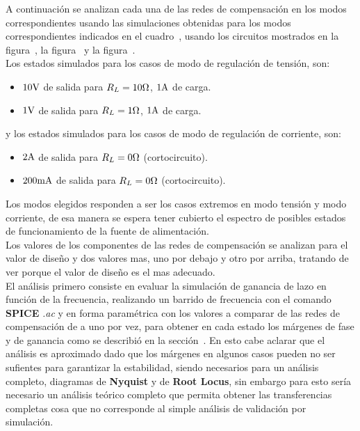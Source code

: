 
A continuación se analizan cada una de las redes de compensación en los modos correspondientes usando las simulaciones obtenidas para los modos correspondientes indicados en el cuadro~, usando los circuitos mostrados en la figura~, la figura~ y la figura~.\\

Los estados simulados para los casos de modo de regulación de tensión, son:

\begin{itemize}
\item $10 \si[per-mode=symbol]{\volt}$ de salida para $R_{L} = 10 \si[per-mode=symbol]{\ohm}$, $1 \si[per-mode=symbol]{\ampere}$ de carga.

\item $1 \si[per-mode=symbol]{\volt}$ de salida para $R_{L} = 1 \si[per-mode=symbol]{\ohm}$, $1 \si[per-mode=symbol]{\ampere}$ de carga.
\end{itemize}

y los estados simulados para los casos de modo de regulación de corriente, son:

\begin{itemize}
\item $2 \si[per-mode=symbol]{\ampere}$ de salida para $R_{L} = 0 \si[per-mode=symbol]{\ohm}$ (cortocircuito).

\item $200 \si[per-mode=symbol]{\milli\ampere}$ de salida para $R_{L} = 0 \si[per-mode=symbol]{\ohm}$ (cortocircuito).
\end{itemize}



Los modos elegidos responden a ser los casos extremos en modo tensión y modo corriente, de esa manera se espera tener cubierto el espectro de posibles estados de funcionamiento de la fuente de alimentación.\\

Los valores de los componentes de las redes de compensación se analizan para el valor de diseño y dos valores mas, uno por debajo y otro por arriba, tratando de ver porque el valor de diseño es el mas adecuado.\\

El análisis primero consiste en evaluar la simulación de ganancia de lazo en función de la frecuencia, realizando un barrido de frecuencia con el comando \textbf{SPICE} \textit{.ac} y en forma paramétrica con los valores a comparar de las redes de compensación de a uno por vez, para obtener en cada estado los márgenes de fase y de ganancia como se describió en la sección~. En esto cabe aclarar que el análisis es aproximado dado que los márgenes en algunos casos pueden no ser sufientes para garantizar la estabilidad, siendo necesarios para un análisis completo, diagramas de \textbf{Nyquist} y de \textbf{Root Locus}, sin embargo para esto sería necesario un análisis teórico completo que permita obtener las transferencias completas cosa que no corresponde al simple análisis de validación por simulación.\\

